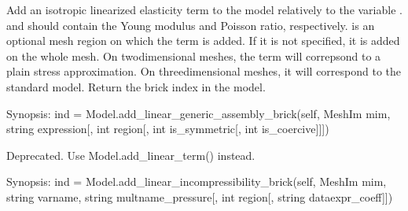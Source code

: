 \documentclass[a4paper,11pt,english]{sphinxmanual}
\begin{document}
\begin{fulllineitems}
\begin{fulllineitems}
\label{\detokenize{python/cmdref_Model:getfem.Model.add_isotropic_linearized_elasticity_brick_pstress}}
Add an isotropic linearized elasticity term to the model relatively to
the variable .  and  should
contain the Young modulus and Poisson ratio, respectively.
 is an optional mesh region on which the term is added.
If it is not specified, it is added
on the whole mesh.
On two\sphinxhyphen{}dimensional meshes, the term will correpsond to a plain stress
approximation. On three\sphinxhyphen{}dimensional meshes, it will correspond to the
standard model. 
Return the brick index in the model.

\end{fulllineitems}


\begin{fulllineitems}
\label{\detokenize{python/cmdref_Model:getfem.Model.add_linear_generic_assembly_brick}}
Synopsis: ind = Model.add\_linear\_generic\_assembly\_brick(self, MeshIm mim, string expression{[}, int region{[}, int is\_symmetric{[}, int is\_coercive{]}{]}{]})

Deprecated. Use Model.add\_linear\_term() instead.

\end{fulllineitems}


\begin{fulllineitems}
\label{\detokenize{python/cmdref_Model:getfem.Model.add_linear_incompressibility_brick}}
Synopsis: ind = Model.add\_linear\_incompressibility\_brick(self, MeshIm mim, string varname, string multname\_pressure{[}, int region{[}, string dataexpr\_coeff{]}{]})


\end{fulllineitems}
\end{fulllineitems}
\end{document}
